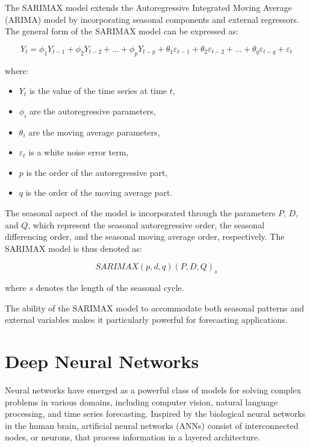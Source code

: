 \documentclass[a4paper,12pt]{article}
\begin{document}
The SARIMAX model extends the Autoregressive Integrated Moving Average (ARIMA) model by incorporating seasonal components and external regressors. The general form of the SARIMAX model can be expressed as:

\begin{equation}
Y_t = \phi_1 Y_{t-1} + \phi_2 Y_{t-2} + \ldots + \phi_p Y_{t-p} + \theta_1 \varepsilon_{t-1} + \theta_2 \varepsilon_{t-2} + \ldots + \theta_q \varepsilon_{t-q} + \varepsilon_t
\end{equation}

where:
\begin{itemize}
    \item \(Y_t\) is the value of the time series at time \(t\),
    \item \(\phi_i\) are the autoregressive parameters,
    \item \(\theta_i\) are the moving average parameters,
    \item \(\varepsilon_t\) is a white noise error term,
    \item \(p\) is the order of the autoregressive part,
    \item \(q\) is the order of the moving average part.
\end{itemize}
 
The seasonal aspect of the model is incorporated through the parameters \(P\), \(D\), and \(Q\), which represent the seasonal autoregressive order, the seasonal differencing order, and the seasonal moving average order, respectively. The SARIMAX model is thus denoted as:

\begin{equation}
SARIMAX(p, d, q)(P, D, Q)_s
\end{equation}

where \(s\) denotes the length of the seasonal cycle. 

The ability of the SARIMAX model to accommodate both seasonal patterns and external variables makes it particularly powerful for forecasting applications. 

\section{Deep Neural Networks}

Neural networks have emerged as a powerful class of models for solving complex problems in various domains, including computer vision, natural language processing, and time series forecasting. Inspired by the biological neural networks in the human brain, artificial neural networks (ANNs) consist of interconnected nodes, or neurons, that process information in a layered architecture.
\end{document}
